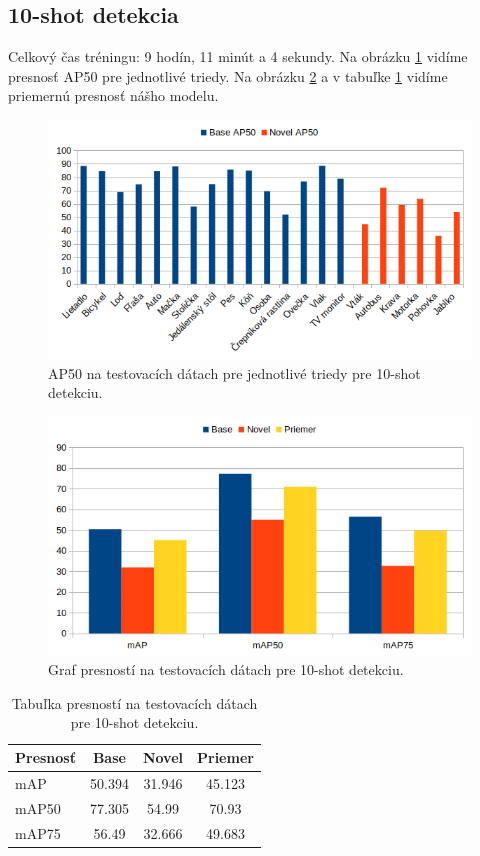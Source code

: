 \subsection{10-shot detekcia}

Celkový čas tréningu: 9 hodín, 11 minút a 4 sekundy. Na obrázku \ref{fig:image31} vidíme presnosť AP50 pre jednotlivé triedy. Na obrázku \ref{fig:image33} a v tabuľke \ref{tab:table5} vidíme priemernú presnosť nášho modelu.

\begin{figure}[H]
\includegraphics[width=\textwidth]{images/10_shot_classes_AP50.png}
\centering
\caption{AP50 na testovacích dátach pre jednotlivé triedy pre 10-shot detekciu.}
\label{fig:image31}
\end{figure}

\begin{figure}[H]
\includegraphics[width=\textwidth]{images/10_shot_meanAP.png}
\centering
\caption{Graf presností na testovacích dátach pre 10-shot detekciu.}
\label{fig:image33}
\end{figure}

\begin{table}[H]
\begin{tabular}{|l|c|c|c|}
\hline
\textbf{Presnosť} & \textbf{Base} & \textbf{Novel} & \textbf{Priemer} \\
\hline
mAP & 50.394 & 31.946 & 45.123 \\
mAP50 & 77.305 & 54.99 & 70.93 \\
mAP75 & 56.49 & 32.666 & 49.683 \\
\hline
\end{tabular}
\centering
\caption{Tabuľka presností na testovacích dátach pre 10-shot detekciu.}
\label{tab:table5}
\end{table}


